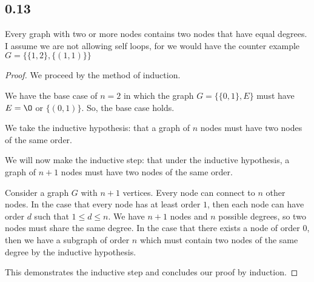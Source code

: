 \documentclass{article}
\begin{document}
\subsection*{0.13}

Every graph with two or more nodes contains two nodes that have equal
degrees. I assume we are not allowing self loops, for we would have the
counter example $G = \{ \{ 1,2 \}, \{(1,1)\} \}$

\begin{proof}

We proceed by the method of induction.

We have the base case of $n=2$ in which the graph $G = \{\{0,1\}, E \}$ must
have $E = \O$ or $\{ (0,1) \}$. So, the base case holds.

We take the inductive hypothesis: that a graph of $n$ nodes must have two
nodes of the same order.

We will now make the inductive step: that under the inductive hypothesis, a
graph of $n+1$ nodes must have two nodes of the same order.

Consider a graph $G$ with $n+1$ vertices. Every node can connect to $n$
other nodes. In the case that  every node has at least order $1$, then each node can
have order $d$ such that $1 \leq d \leq n$. We have $n+1$ nodes and $n$
possible degrees, so two nodes must share the same degree. In the case that
there exists a node of order $0$, then we have a subgraph of order $n$
which must contain two nodes of the same degree by the inductive
hypothesis.

This demonstrates the inductive step and concludes our proof by induction.

\end{proof}
\end{document}
